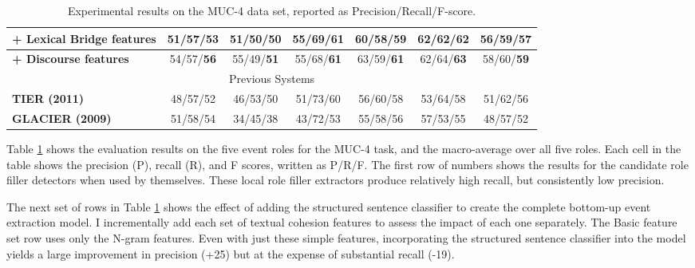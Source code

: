 \begin{table}[t]
\begin{tabular}[center]{|l|ccccc|c|}
{\bf + Lexical Bridge features} & 51/57/53 & 51/50/50 & 55/69/{\bf 61} & 60/58/59 & 62/62/62 & 56/59/57 \\ \hline
{\bf + Discourse features} & 54/57/{\bf 56} & 55/49/{\bf 51} &
55/68/{\bf 61} & 63/59/{\bf 61} & 62/64/{\bf 63} & 58/60/{\bf 59} \\ \hline
\multicolumn{7}{|c|}{Previous Systems} \\ \hline
{\bf TIER (2011)} & 48/57/52 & 46/53/50 & 51/73/60 & 56/60/58 & 53/64/58 & 51/62/56 \\ \hline
{\bf GLACIER (2009)} & 51/58/54 & 34/45/38 & 43/72/53 & 55/58/56 & 57/53/55 & 48/57/52 \\ \hline
\end{tabular}
\caption{Experimental results on the MUC-4 data set, reported as
  Precision/Recall/F-score.}
\label{results-table-linker}
\end{table}

Table \ref{results-table-linker} shows the evaluation results on the five
event roles for the MUC-4 task, and the macro-average over all five
roles.  Each cell in the table shows the precision (P), recall (R),
and F scores, written as P/R/F. The first row of numbers shows the 
results for the candidate role filler detectors when used by themselves. 
These local role filler extractors produce relatively high recall, 
but consistently low precision.

The next set of rows in Table \ref{results-table-linker} shows the effect of adding the
structured sentence classifier to create the complete bottom-up event extraction model.  
I incrementally add each set 
of textual cohesion features to assess the impact of each
one separately.  The Basic feature set row   
uses only
the N-gram features.  Even with just these simple features,
incorporating the structured sentence classifier into the model
yields a large improvement in precision (+25) but at the expense of substantial recall (-19).  

